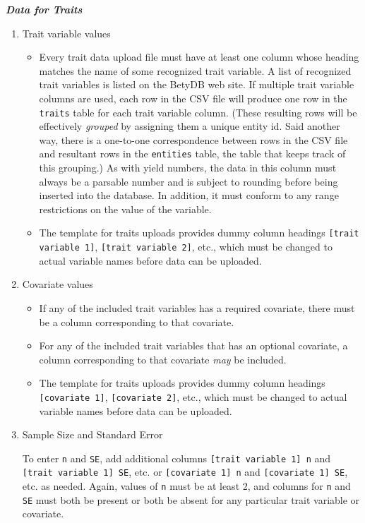 \textbf{\textit{Data for Traits}}

\begin{enumerate}

\item Trait variable values

\begin{itemize}
\item Every trait data upload file must have at least one column whose heading
  matches the name of some recognized trait variable.  A list of
  recognized trait variables is listed on the BetyDB web site.  If
  multiple trait variable columns are used, each row in the CSV file will
  produce one row in the \verb|traits| table for each trait variable column.
  (These resulting rows will be effectively \textit{grouped} by assigning them a
  unique entity id.  Said another way, there is a one-to-one
  correspondence between rows in the CSV file and resultant rows in the
  \verb|entities| table, the table that keeps track of this grouping.)  As with
  yield numbers, the data in this column must always be a parsable number
  and is subject to rounding before being inserted into the database.  In
  addition, it must conform to any range restrictions on the value of the
  variable.
\item The template for traits uploads provides dummy column headings
\verb|[trait variable 1]|, \verb|[trait variable 2]|, etc., which must be changed to
   actual variable names before data can be uploaded.
\end{itemize}

\item Covariate values

\begin{itemize}
\item If any of the included trait variables has a required covariate, there
  must be a column corresponding to that covariate.
\item For any of the included trait variables that has an optional covariate, a
  column corresponding to that covariate \textit{may} be included.
\item The template for traits uploads provides dummy column headings
 \verb|[covariate 1]|, \verb|[covariate 2]|, etc., which must be changed to actual
 variable names before data can be uploaded.
 \end{itemize}
 
\item Sample Size and Standard Error

 To enter \verb|n| and \verb|SE|, add additional columns
 \verb|[trait variable 1] n| and \verb|[trait variable 1] SE|, etc. or
 \verb|[covariate 1] n| and \verb|[covariate 1] SE|, etc. as needed.  Again,
 values of \verb|n| must be at least 2, and columns for \verb|n| and \verb|SE|
 must both be present or both be absent for any particular trait variable or
 covariate.

  \end{enumerate}

